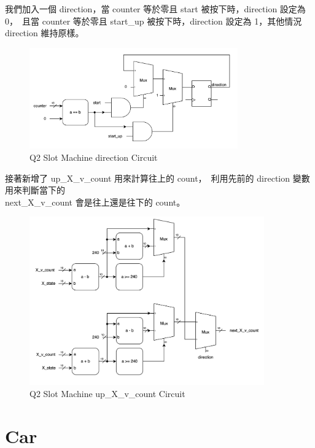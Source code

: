 \documentclass[10.5pt,compsoc,UTF8]{CjC}
\theoremstyle{mystyle}
\begin{document}
\newpage

我們加入一個 direction，當 counter 等於零且 start 被按下時，direction 設定為 0，\
且當 counter 等於零且 start\_up 被按下時，direction 設定為 1，其他情況 direction 維持原樣。

\begin{figure}[!h]
  \centering
  \includegraphics[width=0.8\textwidth]{./img/slot-4.png}
  \caption{Q2 Slot Machine direction Circuit}
  \label{fig:slot-4}
\end{figure}

接著新增了 up\_X\_v\_count 用來計算往上的 count，\
利用先前的 direction 變數用來判斷當下的\\ next\_X\_v\_count 會是往上還是往下的 count。

\begin{figure}[!h]
  \centering
  \includegraphics[width=0.9\textwidth]{./img/slot-5.png}
  \caption{Q2 Slot Machine up\_X\_v\_count Circuit}
  \label{fig:slot-5}
\end{figure}

\section{Car}
\end{document}

